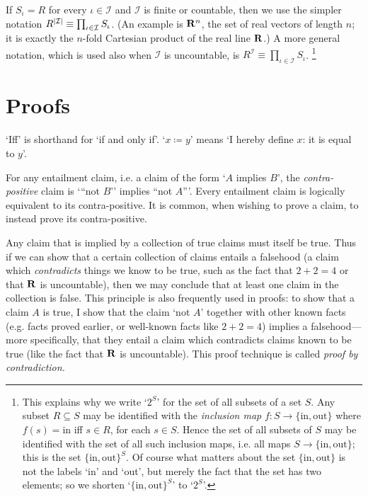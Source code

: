 \documentclass[11pt,letterpaper,reqno,oneside]{book}
\begin{document}
\begin{appendices}
If $S_\iota = R$ for every $\iota \in \mathcal{I}$ and $\mathcal{I}$ is finite or countable, then we use the simpler notation $R^{\abs*{\mathcal{I}}} \equiv \prod_{\iota \in \mathcal{I}} S_\iota$.
(An example is $\mathbf{R}^n$, the set of real vectors of length $n$; it is exactly the $n$-fold Cartesian product of the real line $\mathbf{R}$.)
A more general notation, which is used also when $\mathcal{I}$ is uncountable, is $R^\mathcal{I} \equiv \prod_{\iota \in \mathcal{I}} S_\iota$.%
	\footnote{This explains why we write `$2^S$' for the set of all subsets of a set $S$. Any subset $R \subseteq S$ may be identified with the \emph{inclusion map} $f : S \to \{\text{in},\text{out}\}$ where $f(s)=\text{in}$ iff $s \in R$, for each $s \in S$. Hence the set of all subsets of $S$ may be identified with the set of all such inclusion maps, i.e. all maps $S \to \{\text{in},\text{out}\}$; this is the set $\{\text{in},\text{out}\}^S$. Of course what matters about the set $\{\text{in},\text{out}\}$ is not the labels `in' and `out', but merely the fact that the set has two elements; so we shorten `$\{\text{in},\text{out}\}^S$' to `$2^S$'.}



\section{Proofs}
\label{math:pf}

`Iff' is shorthand for `if and only if'. `$x \coloneqq y$' means `I hereby define $x$: it is equal to $y$'.

For any entailment claim, i.e. a claim of the form `$A$ implies $B$', the \emph{contra-positive} claim is `{``}not $B$'' implies ``not $A${''}'. Every entailment claim is logically equivalent to its contra-positive. It is common, when wishing to prove a claim, to instead prove its contra-positive.

Any claim that is implied by a collection of true claims must itself be true. Thus if we can show that a certain collection of claims entails a falsehood (a claim which \emph{contradicts} things we know to be true, such as the fact that $2+2=4$ or that $\mathbf{R}$ is uncountable), then we may conclude that at least one claim in the collection is false. This principle is also frequently used in proofs: to show that a claim $A$ is true, I show that the claim `not $A$' together with other known facts (e.g. facts proved earlier, or well-known facts like $2+2=4$) implies a falsehood---more specifically, that they entail a claim which contradicts claims known to be true (like the fact that $\mathbf{R}$ is uncountable). This proof technique is called \emph{proof by contradiction.}


\end{appendices}
\end{document}
